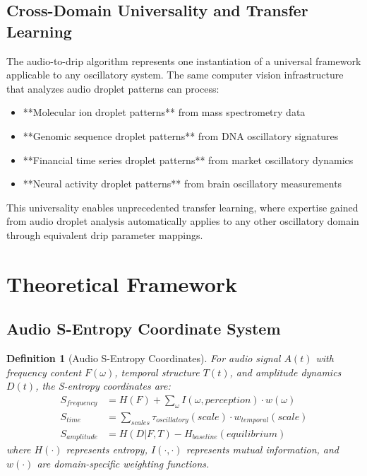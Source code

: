 \documentclass[12pt,a4paper]{article}
\newtheorem{definition}{Definition}
\begin{document}
\subsection{Cross-Domain Universality and Transfer Learning}

The audio-to-drip algorithm represents one instantiation of a universal framework applicable to any oscillatory system. The same computer vision infrastructure that analyzes audio droplet patterns can process:
\begin{itemize}
\item **Molecular ion droplet patterns** from mass spectrometry data
\item **Genomic sequence droplet patterns** from DNA oscillatory signatures  
\item **Financial time series droplet patterns** from market oscillatory dynamics
\item **Neural activity droplet patterns** from brain oscillatory measurements
\end{itemize}

This universality enables unprecedented transfer learning, where expertise gained from audio droplet analysis automatically applies to any other oscillatory domain through equivalent drip parameter mappings.

\section{Theoretical Framework}

\subsection{Audio S-Entropy Coordinate System}

\begin{definition}[Audio S-Entropy Coordinates]
For audio signal $A(t)$ with frequency content $F(\omega)$, temporal structure $T(t)$, and amplitude dynamics $D(t)$, the S-entropy coordinates are:
\begin{align}
S_{frequency} &= H(F) + \sum_{\omega} I(\omega, perception) \cdot w(\omega) \\
S_{time} &= \sum_{scales} \tau_{oscillatory}(scale) \cdot w_{temporal}(scale) \\  
S_{amplitude} &= H(D|F,T) - H_{baseline}(equilibrium)
\end{align}
where $H(\cdot)$ represents entropy, $I(\cdot,\cdot)$ represents mutual information, and $w(\cdot)$ are domain-specific weighting functions.
\end{definition}
\end{document}
